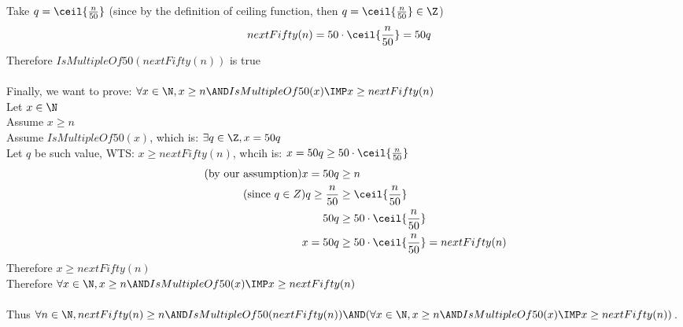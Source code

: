 \documentclass[12pt]{article}
\begin{document}
Take $q = \ceil{\frac{n}{50}}$  (since by the definition of ceiling function, then $q = \ceil{\frac{n}{50}} \in \Z$)
\begin{align*}
    nextFifty(n) = 50 \cdot \ceil{\frac{n}{50}} &= 50q
\end{align*}
Therefore $IsMultipleOf50(nextFifty(n))$ is true\\
\\
Finally, we want to prove: $\forall x \in \N,x \ge n \AND IsMultipleOf50(x) \IMP x \ge nextFifty(n)$\\
Let $x \in \N$\\
Assume $x \ge n$\\
Assume $IsMultipleOf50(x)$, which is: $\exists q \in \Z, x = 50q$\\
Let $q$ be such value, WTS: $x \ge nextFifty(n)$, whcih is: $x = 50q \ge 50 \cdot \ceil{\frac{n}{50}}$
\newpage
\begin{align*}
    \tag{by our assumption}
    x = 50q &\ge n\\
    \tag{since $q \in Z$}
    q \ge \frac{n}{50} &\ge \ceil{\frac{n}{50}}\\
    50q &\ge 50 \cdot \ceil{\frac{n}{50}}\\
    x = 50q &\ge 50 \cdot \ceil{\frac{n}{50}} = nextFifty(n)
\end{align*}
Therefore $x \ge nextFifty(n)$\\
Therefore $\forall x \in \N,x \ge n \AND IsMultipleOf50(x) \IMP x \ge nextFifty(n)$\\
\\
Thus $\forall n \in \N, nextFifty(n) \ge n \AND IsMultipleOf50(nextFifty(n)) \AND (\forall x \in \N,x \ge n \AND IsMultipleOf50(x) \IMP x \ge nextFifty(n))$.
\end{document}
